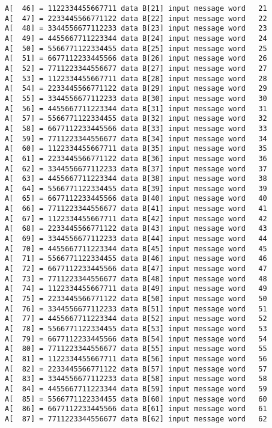 \begin{verbatim}
A[  46] = 1122334455667711 data B[21] input message word   21
A[  47] = 2233445566771122 data B[22] input message word   22
A[  48] = 3344556677112233 data B[23] input message word   23
A[  49] = 4455667711223344 data B[24] input message word   24
A[  50] = 5566771122334455 data B[25] input message word   25
A[  51] = 6677112233445566 data B[26] input message word   26
A[  52] = 7711223344556677 data B[27] input message word   27
A[  53] = 1122334455667711 data B[28] input message word   28
A[  54] = 2233445566771122 data B[29] input message word   29
A[  55] = 3344556677112233 data B[30] input message word   30
A[  56] = 4455667711223344 data B[31] input message word   31
A[  57] = 5566771122334455 data B[32] input message word   32
A[  58] = 6677112233445566 data B[33] input message word   33
A[  59] = 7711223344556677 data B[34] input message word   34
A[  60] = 1122334455667711 data B[35] input message word   35
A[  61] = 2233445566771122 data B[36] input message word   36
A[  62] = 3344556677112233 data B[37] input message word   37
A[  63] = 4455667711223344 data B[38] input message word   38
A[  64] = 5566771122334455 data B[39] input message word   39
A[  65] = 6677112233445566 data B[40] input message word   40
A[  66] = 7711223344556677 data B[41] input message word   41
A[  67] = 1122334455667711 data B[42] input message word   42
A[  68] = 2233445566771122 data B[43] input message word   43
A[  69] = 3344556677112233 data B[44] input message word   44
A[  70] = 4455667711223344 data B[45] input message word   45
A[  71] = 5566771122334455 data B[46] input message word   46
A[  72] = 6677112233445566 data B[47] input message word   47
A[  73] = 7711223344556677 data B[48] input message word   48
A[  74] = 1122334455667711 data B[49] input message word   49
A[  75] = 2233445566771122 data B[50] input message word   50
A[  76] = 3344556677112233 data B[51] input message word   51
A[  77] = 4455667711223344 data B[52] input message word   52
A[  78] = 5566771122334455 data B[53] input message word   53
A[  79] = 6677112233445566 data B[54] input message word   54
A[  80] = 7711223344556677 data B[55] input message word   55
A[  81] = 1122334455667711 data B[56] input message word   56
A[  82] = 2233445566771122 data B[57] input message word   57
A[  83] = 3344556677112233 data B[58] input message word   58
A[  84] = 4455667711223344 data B[59] input message word   59
A[  85] = 5566771122334455 data B[60] input message word   60
A[  86] = 6677112233445566 data B[61] input message word   61
A[  87] = 7711223344556677 data B[62] input message word   62

\end{verbatim}
